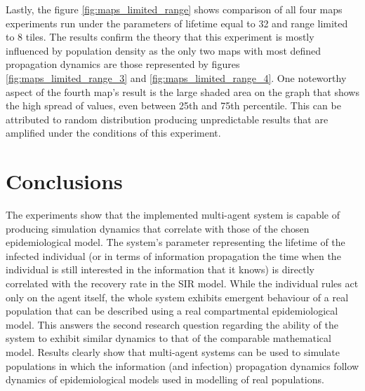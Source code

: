 Lastly, the figure \ref{fig:maps_limited_range} shows comparison of all four maps experiments run under the parameters of lifetime equal to 32 and range limited to 8 tiles.
The results confirm the theory that this experiment is mostly influenced by population density as the only two maps with most defined propagation dynamics are those represented by figures \ref{fig:maps_limited_range_3} and \ref{fig:maps_limited_range_4}.
One noteworthy aspect of the fourth map's result is the large shaded area on the graph that shows the high spread of values, even between 25th and 75th percentile.
This can be attributed to random distribution producing unpredictable results that are amplified under the conditions of this experiment.

\section{Conclusions}

The experiments show that the implemented multi-agent system is capable of producing simulation dynamics that correlate with those of the chosen epidemiological model.
The system's parameter representing the lifetime of the infected individual (or in terms of information propagation the time when the individual is still interested in the information that it knows) is directly correlated with the recovery rate in the SIR model.
While the individual rules act only on the agent itself, the whole system exhibits emergent behaviour of a real population that can be described using a real compartmental epidemiological model.
This answers the second research question regarding the ability of the system to exhibit similar dynamics to that of the comparable mathematical model.
Results clearly show that multi-agent systems can be used to simulate populations in which the information (and infection) propagation dynamics follow dynamics of epidemiological models used in modelling of real populations.